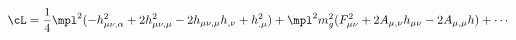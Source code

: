 \begin{equation}
\cL =
\frac{1}{4}\mpl^2( -h_{\mu \nu , \alpha}^2 
+ 2 h_{\mu\nu , \mu}^2 
- 2 h_{\mu \nu , \mu} h_{,\nu} 
+ h_{,\mu}^2)
+ 
\mpl^2 m_g^2
(F_{\mu \nu}^2 + 2
A_{\mu , \nu} h_{\mu \nu} - 2 A_{\mu , \mu} h ) + \cdots \label{hkin}
\end{equation}

